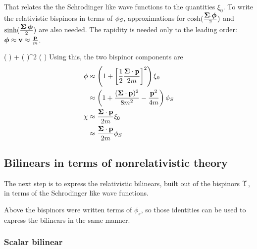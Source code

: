 That relates the the Schrodinger like wave functions to the quantities $\xi_0$.  To write the relativistic bispinors in terms of $\phi_S$, approximations for $\cosh( \frac{\mbox{\boldmath$ \Sigma $} \cdot \mbox{\boldmath$ \phi $} }{2})$ and $\sinh( \frac{\mbox{\boldmath$ \Sigma $} \cdot \mbox{\boldmath$ \phi $} }{2})$ are also needed.  The rapidity is needed only to the leading order: $\mbox{\boldmath$ \phi $} \approx \mathbf{v} \approx \frac{\mathbf{p} }{m}$. 

\beq
	\cosh( ) 
		 + \left(  \right)^2
\eeq
\beq
	\sinh( ) 
		\approx   {}
\eeq
Using this, the two bispinor components are
\begin{align}
\phi 
	&\approx  \left(  1 + \left[ \frac{1}{2}\frac{\mbox{\boldmath$ \Sigma $} \cdot \mathbf{p} }{2m} \right]^2 \right) \xi_0 \notag \\
	&\approx  \left(  1 + \frac{(\mbox{\boldmath$ \Sigma $} \cdot \mathbf{p})^2 }{8m^2} - \frac{\mathbf{p}^2}{4m} \right ) \phi_S	 \label{eq:nrPhi} \\
 \chi
 	&\approx	\frac{\mbox{\boldmath$ \Sigma $} \cdot \mathbf{p} }{2m} \xi_0 \notag \\
 	&\approx	\frac{\mbox{\boldmath$ \Sigma $} \cdot \mathbf{p} }{2m} \phi_S  \label{eq:nrChi}
\end{align}




\subsection{Bilinears in terms of nonrelativistic theory}
The next step is to express the relativistic bilinears, built out of the bispinors $\Upsilon$, in terms of the Schrodinger like wave functions.

Above the bispinors were written terms of $\phi_s$, so those identities can be used to express the bilinears in the same manner.  


\subsubsection{Scalar bilinear}

